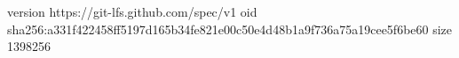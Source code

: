 version https://git-lfs.github.com/spec/v1
oid sha256:a331f422458ff5197d165b34fe821e00c50e4d48b1a9f736a75a19cee5f6be60
size 1398256
